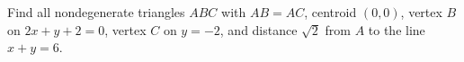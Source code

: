 Find all nondegenerate triangles $ABC$ with $AB=AC$, centroid $(0,0)$, vertex $B$ on $2x+y+2=0$, vertex $C$ on $y=-2$, and distance $\sqrt2$ from $A$ to the line $x+y=6$.

